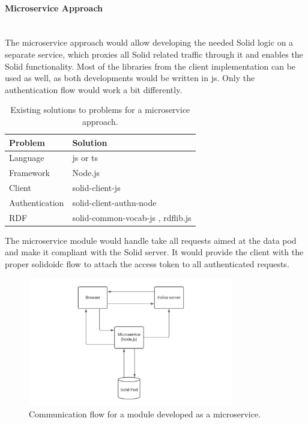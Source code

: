 \paragraph{Microservice Approach}\mbox{}\\

The microservice approach would allow developing the needed Solid logic on a separate service, which proxies all Solid related traffic through it and enables the Solid functionality. Most of the libraries from the client implementation can be used as well, as both developments would be written in \gls{js}. Only the authentication flow would work a bit differently.

\begin{table}[h!]
    \centering
    \begin{tabular}{| l | l |} 
    \hline
     Problem & Solution \\
     \hline
      Language & \gls{js} or \gls{ts}  \\
      Framework & Node.js  \\
      Client & solid-client-js \cite{solid-client-js}  \\
      Authentication & solid-client-authn-node \cite{solid-client-authn-node} \\
      RDF & solid-common-vocab-js \cite{solid-common-vocab-js}, rdflib.js \cite{rdflib.js}  \\
    \hline
    \end{tabular}
    \vspace{0.75cm}
    \caption{Existing solutions to problems for a microservice approach.}
    \label{table:2}
\end{table}

The microservice module would handle take all requests aimed at the data pod and make it compliant with the Solid server. It would provide the client with the proper \gls{solidoidc} flow to attach the access token to all authenticated requests.

\begin{figure}[H]
    \centering
    \includegraphics[width=0.8\textwidth]{prototype/graphs/poc-infrastructure-microservice.jpeg}
    \caption{Communication flow for a module developed as a microservice.}
    \label{fig:poc-infrastructure-microservice}
\end{figure}

